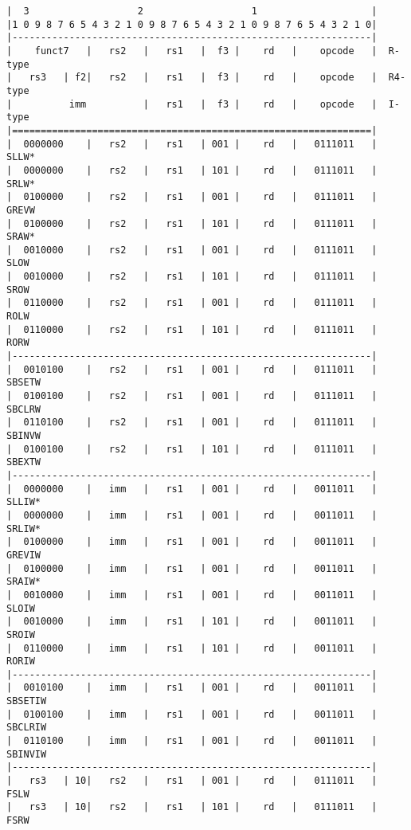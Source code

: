 \begin{minipage}{\linewidth}
\begin{verbatim}
|  3                   2                   1                    |
|1 0 9 8 7 6 5 4 3 2 1 0 9 8 7 6 5 4 3 2 1 0 9 8 7 6 5 4 3 2 1 0|
|---------------------------------------------------------------|
|    funct7   |   rs2   |   rs1   |  f3 |    rd   |    opcode   |  R-type
|   rs3   | f2|   rs2   |   rs1   |  f3 |    rd   |    opcode   |  R4-type
|          imm          |   rs1   |  f3 |    rd   |    opcode   |  I-type
|===============================================================|
|  0000000    |   rs2   |   rs1   | 001 |    rd   |   0111011   |  SLLW*
|  0000000    |   rs2   |   rs1   | 101 |    rd   |   0111011   |  SRLW*
|  0100000    |   rs2   |   rs1   | 001 |    rd   |   0111011   |  GREVW
|  0100000    |   rs2   |   rs1   | 101 |    rd   |   0111011   |  SRAW*
|  0010000    |   rs2   |   rs1   | 001 |    rd   |   0111011   |  SLOW
|  0010000    |   rs2   |   rs1   | 101 |    rd   |   0111011   |  SROW
|  0110000    |   rs2   |   rs1   | 001 |    rd   |   0111011   |  ROLW
|  0110000    |   rs2   |   rs1   | 101 |    rd   |   0111011   |  RORW
|---------------------------------------------------------------|
|  0010100    |   rs2   |   rs1   | 001 |    rd   |   0111011   |  SBSETW
|  0100100    |   rs2   |   rs1   | 001 |    rd   |   0111011   |  SBCLRW
|  0110100    |   rs2   |   rs1   | 001 |    rd   |   0111011   |  SBINVW
|  0100100    |   rs2   |   rs1   | 101 |    rd   |   0111011   |  SBEXTW
|---------------------------------------------------------------|
|  0000000    |   imm   |   rs1   | 001 |    rd   |   0011011   |  SLLIW*
|  0000000    |   imm   |   rs1   | 001 |    rd   |   0011011   |  SRLIW*
|  0100000    |   imm   |   rs1   | 001 |    rd   |   0011011   |  GREVIW
|  0100000    |   imm   |   rs1   | 001 |    rd   |   0011011   |  SRAIW*
|  0010000    |   imm   |   rs1   | 001 |    rd   |   0011011   |  SLOIW
|  0010000    |   imm   |   rs1   | 101 |    rd   |   0011011   |  SROIW
|  0110000    |   imm   |   rs1   | 101 |    rd   |   0011011   |  RORIW
|---------------------------------------------------------------|
|  0010100    |   imm   |   rs1   | 001 |    rd   |   0011011   |  SBSETIW
|  0100100    |   imm   |   rs1   | 001 |    rd   |   0011011   |  SBCLRIW
|  0110100    |   imm   |   rs1   | 001 |    rd   |   0011011   |  SBINVIW
|---------------------------------------------------------------|
|   rs3   | 10|   rs2   |   rs1   | 001 |    rd   |   0111011   |  FSLW
|   rs3   | 10|   rs2   |   rs1   | 101 |    rd   |   0111011   |  FSRW

\end{verbatim}
\end{minipage}
